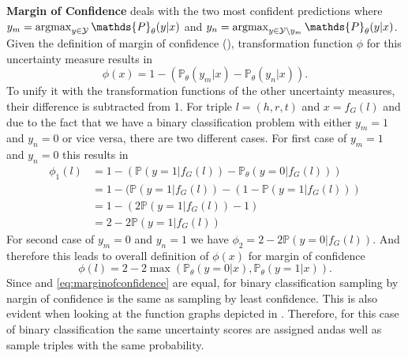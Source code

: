 \textbf{Margin of Confidence}
deals with the two most confident predictions where
$y_m = \argmax_{y \in \mathcal{Y}} \mathds{P}_{\theta}(y | x)$ 
and $y_n = \argmax_{y \in \mathcal{Y} \setminus y_m}{\mathds{P}_{\theta}(y | x)}$.
Given the definition of margin of confidence (), transformation function $\phi$ for this uncertainty measure results in
\begin{equation}
    \phi(x) = 1 - (\mathds{P}_{\theta}(y_m |x) - \mathds{P}_{\theta}(y_n | x)).
\end{equation}
To unify it with the transformation functions of the other uncertainty measures, their difference is subtracted from 1.
For triple $l = (h,r,t)$ and $x = f_G(l)$ and due to the fact that we have a binary classification problem with either $y_m = 1$ and $y_n = 0$ or vice versa, there are two different cases.
For first case of $y_m = 1$ and $y_n = 0$ this results in
\begin{equation}
\begin{split}
\phi_1(l) 
&= 1 - (\mathds{P}(y = 1 |f_G(l)) - \mathds{P}_{\theta}(y = 0 | f_G(l))) \\
&= 1 - (\mathds{P}(y = 1 |f_G(l)) -  (1 - \mathds{P}(y = 1 | f_G(l))) \\
&= 1 - (2 \mathds{P}(y = 1 |f_G(l)) - 1) \\
&= 2 - 2 \mathds{P}(y = 1 |f_G(l))
\end{split}
\end{equation}
For second case of $y_m = 0$ and $y_n = 1$ we have  $\phi_2 = 2 - 2 \mathds{P}(y = 0 |f_G(l))$. 
And therefore this leads to overall definition of $\phi(x)$ for margin of confidence
\begin{equation} \label{eq:marginofconfidence}
    \phi(l) = 2 - 2 \max(\mathds{P}_{\theta}(y = 0 |x), \mathds{P}_{\theta}(y = 1 |x)).
\end{equation}
Since  and \ref{eq:marginofconfidence} are equal, for binary classification sampling by nargin of confidence is the same as sampling by least confidence.
This is also evident when looking at the function graphs depicted in .
Therefore, for this case of binary classification the same uncertainty scores are assigned and\usmax as well as \ussoftmax sample triples with the same probability.

